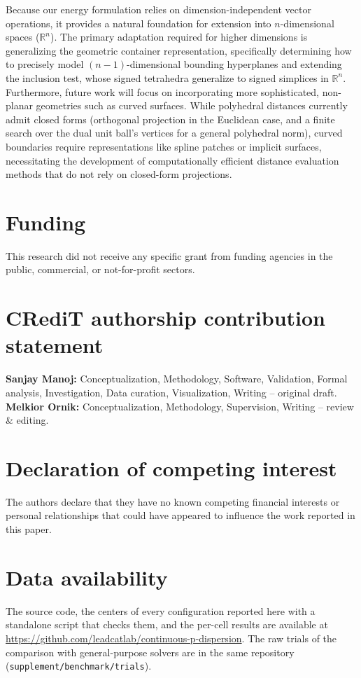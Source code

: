 \documentclass[preprint,12pt]{elsarticle}
\theoremstyle{remark}
\def \R {\mathbb{R}}
\begin{document}
Because our energy formulation relies on dimension-independent vector
operations, it provides a natural foundation for extension into $n$-dimensional
spaces ($\mathbb{R}^n$). The primary adaptation required for higher dimensions
is generalizing the geometric container representation, specifically determining
how to precisely model $(n-1)$-dimensional bounding hyperplanes and extending
the inclusion test, whose signed tetrahedra generalize to signed simplices in
$\R^n$. Furthermore, future work will focus on incorporating more sophisticated,
non-planar geometries such as curved surfaces. While polyhedral distances
currently admit closed forms (orthogonal projection in the Euclidean case, and a
finite search over the dual unit ball's vertices for a general polyhedral norm),
curved boundaries require representations like spline patches or implicit
surfaces, necessitating the development of computationally efficient distance
evaluation methods that do not rely on closed-form projections.

\section*{Funding}
This research did not receive any specific grant from funding agencies in the
public, commercial, or not-for-profit sectors.

\section*{CRediT authorship contribution statement}
\textbf{Sanjay Manoj:} Conceptualization, Methodology, Software, Validation,
Formal analysis, Investigation, Data curation, Visualization, Writing --
original draft. \textbf{Melkior Ornik:} Conceptualization, Methodology,
Supervision, Writing -- review \& editing.

\section*{Declaration of competing interest}
The authors declare that they have no known competing financial interests or
personal relationships that could have appeared to influence the work reported
in this paper.

\section*{Data availability}
The source code, the centers of every configuration reported here with a
standalone script that checks them, and the per-cell results are available at
\url{https://github.com/leadcatlab/continuous-p-dispersion}. The raw trials of
the comparison with general-purpose solvers are in the same repository
(\texttt{supplement/benchmark/trials}).
\end{document}
